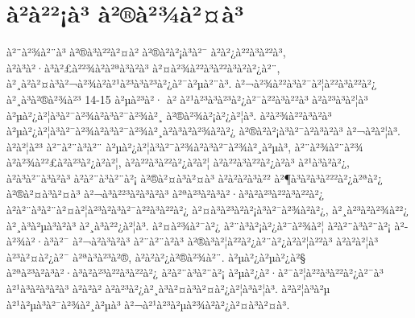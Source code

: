 
\chapter{à²à²²¡à³ à²®à²¾à²¤à³}

à²¨à²¾à²¨à³ à²®à³à²²à²¤à² à²®à²à²¡à³à²¯ à²à²¿à²²à³à²²à³, à²à³à²·à³à²£à²²¾à²à²ªà³à²à³ à²¤à²¾à²²à³à²²à³à²à²¿à²¨, à²¸à²à²¤à³à²¬à²¾à²à²¹à²³à³à²³à²¿à²¯à²µà²¨à³. à²¬à²¾à²²à³à²¯à²¦à²²à³à²²à²¿ à²¸à³à²®à²¾à²³ 14-15 à²µà²³à²· à² à²¹à²³à³à²³à²¿à²¯à²²à³à²²à³ à²à²³à³à²¦à³ à²µà²¿à²¦à³à²¯à²¾à²­à³à²¯à²¾à²¸ à²®à²¾à²¡à²¿à²¦à³. à²à²¾à²²à³à²à³ à²µà²¿à²¦à³à²¯à²¾à²­à³à²¯à²¾à²¸à²à³à²à²¾à²à²¿ à²®à²à²¡à³à²¯à²à³à²à³ à²¬à²à²¦à³. à²à²¦à²³ à²¨à²¨à³à²¨ à²µà²¿à²¦à³à²¯à²¾à²­à³à²¯à²¾à²¸à²µà³, à²¨à²¾à²¨à²¾ à²à²¾à²²£à²à²³à²¿à²à²¦, à²à²²à³à²²à²¿à²à²¦ à²à²²à³à²²à²¿à²à³ à²¹à³à²à²¿, à²à³à²¨à³à²à³ à²à²¨à³à²¨à²¡ à²®à²¤à³à²¤à³ à²à²à²à³à²² à²¶à³à²à³à²²²à²¿à²ªà²¿ à²®à²¤à³à²¤à³ à²¬à³à²²³à²à³à²à³ à²ªà²³à²à³à²·à³à²à²³à²²à³à²²à²¿ à²à²¨à³à²¨à²¤à²¦à²³à²à³à²¯à²²à³à²²à²¿ à²¤à³à²³à²à²¡à³à²¯à²¾à²à²¿, à²¸à²³à²à²¾à²²¿ à²¸à³à²µà³à²à³ à²¸à³à²²¿à²¦à³. à²¤à²¾à²¯à²¿ à²¨à³à²¡à²¿à²¯à²¾à²¦ à²à²¨à³à²¨à²¡ à²­à²¾à²·à³à²¯ à²¬à²à³à²à³ à²¨à²¨à²à³ à²®à³à²¦à²²à²¿à²¨à²¿à²à²¦à²²à³ à²à²à²¦à³ à²³à²¤à²¿à²¯ à²ªà³à²³à²®, à²à²­à²¿à²®à²¾à²¨. à²µà²¿à²µà²¿à²§ à²ªà²³à²à³à²·à³à²à²³à²²à³à²²à²¿ à²à²¨à³à²¨à²¡ à²µà²¿à²·à²¯à²¦à²²à³à²²à²¿à²¯à³ à²¹à³à²à³à²à³ à²à²à² à²à²³à²¿à²¸à³à²¤à³à²¤à²¿à²¦à³à²¦à³. à²à²¦à³à²µ à²¹à²µà³à²¯à²¾à²¸à²µà³ à²¬à²¹à²³à²µà²¾à²à²¿à²¤à³à²¤à³. 


